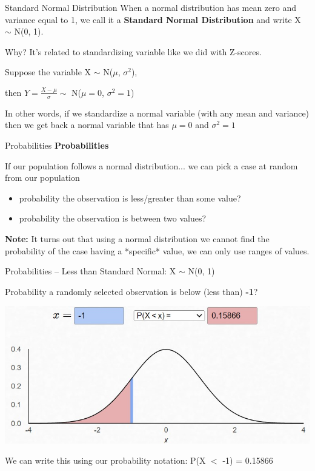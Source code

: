 \documentclass{beamer}
\begin{document}
\begin{frame}{Standard Normal Distribution}
When a normal distribution has mean zero and variance equal to 1, we call it a \textbf{Standard Normal Distribution} and write X $\sim$ N(0, 1). \vspace{4mm}

Why? It's related to standardizing variable like we did with Z-scores. \vspace{12mm}

Suppose the variable X $\sim$ N($\mu$, $\sigma^2$), 

then $Y = \frac{X-\mu}{\sigma} \sim$ N($\mu=0$, $\sigma^2=1$) \vspace{6mm}

In other words, if we standardize a normal variable (with any mean and variance) then we get back a normal variable that has $\mu = 0$ and $\sigma^2=1$
\end{frame}

\begin{frame}{Probabilities}
\textbf{Probabilities}

If our population follows a normal distribution... we can pick a case at random from our population
\begin{itemize}
    \item probability the observation is less/greater than some value?
    \item probability the observation is between two values?
\end{itemize} \vspace{10mm}

\textbf{Note:} It turns out that using a normal distribution we cannot find the probability of the case having a *specific* value, we can only use ranges of values.
\end{frame}

\begin{frame}{Probabilities -- Less than}
Standard Normal: X $\sim$ N(0, 1)

Probability a randomly selected observation is below (less than) \textbf{-1}?
\begin{center}
    \includegraphics[scale=.7]{img/norm_prob1.jpg}
\end{center}
We can write this using our probability notation: P(X $<$ -1) = 0.15866

\end{frame}
\end{document}

